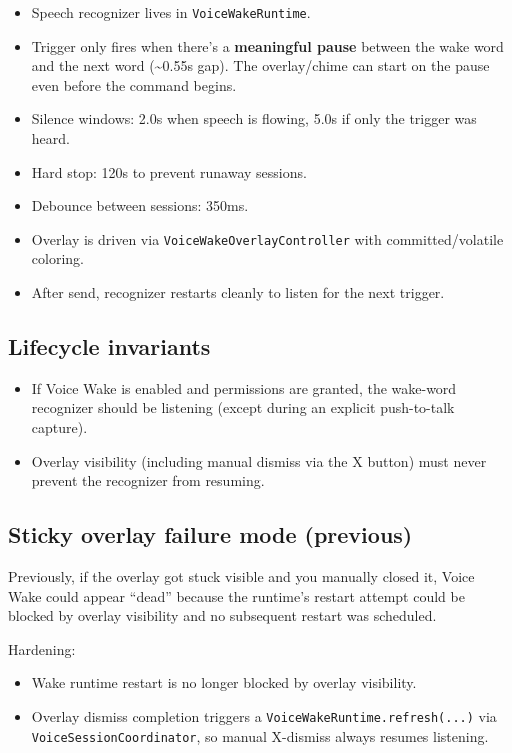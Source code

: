 \begin{itemize}
  \item Speech recognizer lives in \texttt{VoiceWakeRuntime}.
  \item Trigger only fires when there’s a \textbf{meaningful pause} between the wake word and the next word (\textasciitilde{}0.55s gap). The overlay/chime can start on the pause even before the command begins.
  \item Silence windows: 2.0s when speech is flowing, 5.0s if only the trigger was heard.
  \item Hard stop: 120s to prevent runaway sessions.
  \item Debounce between sessions: 350ms.
  \item Overlay is driven via \texttt{VoiceWakeOverlayController} with committed/volatile coloring.
  \item After send, recognizer restarts cleanly to listen for the next trigger.
\end{itemize}


\subsection{Lifecycle invariants}


\begin{itemize}
  \item If Voice Wake is enabled and permissions are granted, the wake-word recognizer should be listening (except during an explicit push-to-talk capture).
  \item Overlay visibility (including manual dismiss via the X button) must never prevent the recognizer from resuming.
\end{itemize}


\subsection{Sticky overlay failure mode (previous)}


Previously, if the overlay got stuck visible and you manually closed it, Voice Wake could appear “dead” because the runtime’s restart attempt could be blocked by overlay visibility and no subsequent restart was scheduled.

Hardening:

\begin{itemize}
  \item Wake runtime restart is no longer blocked by overlay visibility.
  \item Overlay dismiss completion triggers a \texttt{VoiceWakeRuntime.refresh(...)} via \texttt{VoiceSessionCoordinator}, so manual X-dismiss always resumes listening.
\end{itemize}


